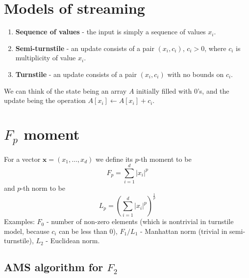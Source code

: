 \documentclass[11pt]{article}
\begin{document}

\section{Models of streaming}
\begin{enumerate}
    \item \textbf{Sequence of values} - the input is simply a sequence of values $x_i$.
    \item \textbf{Semi-turnstile} - an update consists of a pair $(x_i, c_i)$, $c_i > 0$, where $c_i$ is multiplicity of value $x_i$.
    \item \textbf{Turnstile} - an update consists of a pair $(x_i, c_i)$ with no bounds on $c_i$.
\end{enumerate}
We can think of the state being an array $A$ initially filled with $0$'s, and the update being the operation $A[x_i] \gets A[x_i] + c_i$.
\section{$F_p$ moment}
For a vector $\mathbf{x} = (x_1, \dots, x_d)$ we define its $p$-th moment to be
$$ F_p = \sum_{i=1}^d |x_i|^p$$
and $p$-th norm to be
$$L_p = \left( \sum_{i=1}^d |x_i|^p\right)^{\frac{1}{p}}$$
Examples: $F_0$ - number of non-zero elements (which is nontrivial in turnstile model, because $c_i$ can be less than 0), $F_1/L_1$ - Manhattan norm (trivial in semi-turnstile), $L_2$ - Euclidean norm.

\subsection{AMS algorithm for $F_2$ \cite{DBLP:conf/stoc/AlonMS96} }
\end{document}
